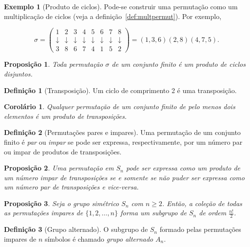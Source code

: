 \documentclass[a4paper,12pt]{report}
\theoremstyle{plain}
\newtheorem{proposicao}{Proposição}[section]
\newtheorem{corolario}{Corolário}[section]
\theoremstyle{definition}
\newtheorem{definicao}{Definição}[section]
\newtheorem{exemplo}{Exemplo}[section]
\begin{document}
\begin{exemplo}[Produto de ciclos]
	Pode-se construir uma permutação como um multiplicação de ciclos (veja a definição~\ref{def:multpermut}). Por exemplo,
	
	$$
	\sigma = 
	\begin{pmatrix}
		1 & 2 & 3 & 4 & 5 & 6 & 7 & 8\\
		\downarrow & \downarrow & \downarrow & \downarrow & \downarrow & \downarrow & \downarrow & \downarrow\\
		3 & 8 & 6 & 7 & 4 & 1 & 5 & 2
	\end{pmatrix}
	= (1,3,6)(2,8)(4,7,5).
	$$
\end{exemplo}

\begin{proposicao}
	Toda permutação $\sigma$ de um conjunto finito é um produto de ciclos disjuntos.
\end{proposicao}

\begin{definicao}[Transposição]
	Um ciclo de comprimento 2 é uma transposição.
\end{definicao}

\begin{corolario}
	Qualquer permutação de um conjunto finito de pelo menos dois elementos é um produto de transposições.	
\end{corolario}

\begin{definicao}[Permutações pares e impares]
	Uma permutação de um conjunto finito é \emph{par} ou \emph{impar} se pode ser expressa, respectivamente, por um número par ou impar de produtos de transposições.
\end{definicao}

\begin{proposicao}
	Uma permutação em $S_n$ pode ser expressa como um produto de um número impar de transposições se e somente se não puder ser expressa como um número par de transposições e vice-versa.
\end{proposicao}

\begin{proposicao}
	Seja o grupo simétrico $S_n$ com $n\geq 2$. Então, a coleção de todas as permutações impares de $\{1,2,\dots,n\}$ forma um subgrupo de $S_n$ de ordem $\frac{n!}{2}$.	
\end{proposicao}

\begin{definicao}[Grupo alternado]
	O subgrupo de $S_n$ formado pelas permutações impares de $n$ símbolos é chamado \emph{grupo alternado $A_n$}.
\end{definicao}
\end{document}
